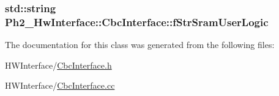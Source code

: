 \hypertarget{class_ph2___hw_interface_1_1_cbc_interface_a61c9447688cc556e33d7051c26459755}{
\subsubsection[{f\-Str\-Sram\-User\-Logic}]{\setlength{\rightskip}{0pt plus 5cm}std\-::string Ph2\-\_\-\-Hw\-Interface\-::\-Cbc\-Interface\-::f\-Str\-Sram\-User\-Logic\hspace{0.3cm}{\ttfamily [private]}}}\label{class_ph2___hw_interface_1_1_cbc_interface_a61c9447688cc556e33d7051c26459755}


The documentation for this class was generated from the following files\-:\begin{DoxyCompactItemize}
\item 
H\-W\-Interface/\hyperlink{_cbc_interface_8h}{Cbc\-Interface.\-h}\item 
H\-W\-Interface/\hyperlink{_cbc_interface_8cc}{Cbc\-Interface.\-cc}\end{DoxyCompactItemize}
